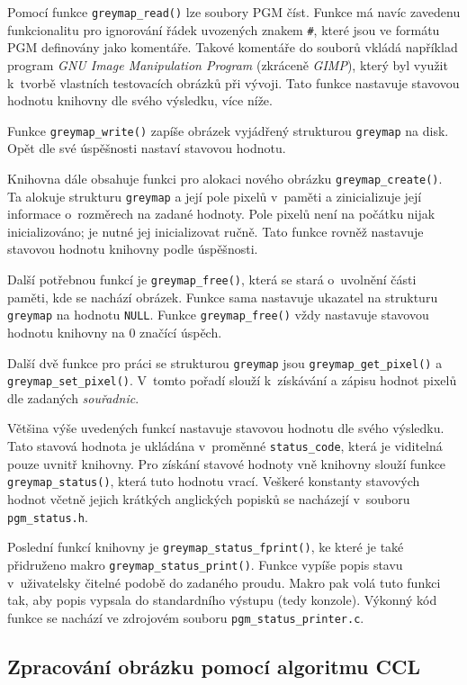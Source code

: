 Pomocí funkce \verb|greymap_read()| lze soubory PGM číst. Funkce má navíc zavedenu funkcionalitu pro ignorování řádek
uvozených znakem \verb|#|, které jsou ve formátu PGM definovány jako komentáře. Takové komentáře do souborů vkládá
například program \textit{GNU Image Manipulation Program} (zkráceně \textit{GIMP}), který byl využit k~tvorbě vlastních
testovacích obrázků při vývoji. Tato funkce nastavuje stavovou hodnotu knihovny dle svého výsledku, více níže.

Funkce \verb|greymap_write()| zapíše obrázek vyjádřený strukturou \verb|greymap| na disk. Opět dle své úspěšnosti
nastaví stavovou hodnotu.

Knihovna dále obsahuje funkci pro alokaci nového obrázku \verb|greymap_create()|. Ta alokuje strukturu \verb|greymap|
a její pole pixelů v~paměti a zinicializuje její informace o~rozměrech na zadané hodnoty. Pole pixelů
není na počátku nijak inicializováno; je nutné jej inicializovat ručně. Tato funkce rovněž nastavuje stavovou hodnotu
knihovny podle úspěšnosti.

Další potřebnou funkcí je \verb|greymap_free()|, která se stará o~uvolnění části paměti, kde se nachází obrázek.
Funkce sama nastavuje ukazatel na strukturu \verb|greymap| na hodnotu \verb|NULL|. Funkce \verb|greymap_free()| vždy
nastavuje stavovou hodnotu knihovny na 0 značící úspěch.

Další dvě funkce pro práci se strukturou \verb|greymap| jsou \verb|greymap_get_pixel()| a \verb|greymap_set_pixel()|.
V~tomto pořadí slouží k~získávání a zápisu hodnot pixelů dle zadaných \textit{souřadnic}.

Většina výše uvedených funkcí nastavuje stavovou hodnotu dle svého výsledku. Tato stavová hodnota je ukládána v~proměnné
\verb|status_code|, která je viditelná pouze uvnitř knihovny. Pro získání stavové hodnoty vně knihovny slouží funkce
\verb|greymap_status()|, která tuto hodnotu vrací. Veškeré konstanty stavových hodnot včetně jejich krátkých anglických
popisků se nacházejí v~souboru \verb|pgm_status.h|.

Poslední funkcí knihovny je \verb|greymap_status_fprint()|, ke které je také přidruženo makro
\verb|greymap_status_print()|. Funkce vypíše popis stavu v~uživatelsky čitelné podobě do zadaného proudu. Makro pak volá
tuto funkci tak, aby popis vypsala do standardního výstupu (tedy konzole). Výkonný kód funkce se nachází ve zdrojovém
souboru \verb|pgm_status_printer.c|.


\subsection[Zpracování obrázku pomocí CCL]{Zpracování obrázku pomocí algoritmu CCL}

